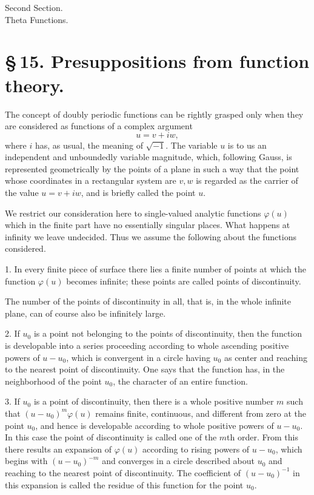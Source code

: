 \documentclass[11pt]{article}
\begin{document}
\begin{center}
{\large Second Section.}\\[0.7em]
{\Large Theta Functions.}
\end{center}

\section*{\S\,15. Presuppositions from function theory.}

The concept of doubly periodic functions can be rightly grasped only when they are considered as functions of a complex argument
\[
u=v+iw,
\]
where $i$ has, as usual, the meaning of $\sqrt{-1}$. The variable $u$ is to us an independent and unboundedly variable magnitude, which, following Gauss, is represented geometrically by the points of a plane in such a way that the point whose coordinates in a rectangular system are $v,w$ is regarded as the carrier of the value $u=v+iw$, and is briefly called the point $u$.

We restrict our consideration here to single-valued analytic functions $\varphi(u)$ which in the finite part have no essentially singular places. What happens at infinity we leave undecided. Thus we assume the following about the functions considered.

1. In every finite piece of surface there lies a finite number of points at which the function $\varphi(u)$ becomes infinite; these points are called points of discontinuity.

The number of the points of discontinuity in all, that is, in the whole infinite plane, can of course also be infinitely large.

2. If $u_0$ is a point not belonging to the points of discontinuity, then the function is developable into a series proceeding according to whole ascending positive powers of $u-u_0$, which is convergent in a circle having $u_0$ as center and reaching to the nearest point of discontinuity. One says that the function has, in the neighborhood of the point $u_0$, the character of an entire function.

3. If $u_0$ is a point of discontinuity, then there is a whole positive number $m$ such that $(u-u_0)^m\varphi(u)$ remains finite, continuous, and different from zero at the point $u_0$, and hence is developable according to whole positive powers of $u-u_0$. In this case the point of discontinuity is called one of the $m$th order. From this there results an expansion of $\varphi(u)$ according to rising powers of $u-u_0$, which begins with $(u-u_0)^{-m}$ and converges in a circle described about $u_0$ and reaching to the nearest point of discontinuity. The coefficient of $(u-u_0)^{-1}$ in this expansion is called the residue of this function for the point $u_0$.
\end{document}

